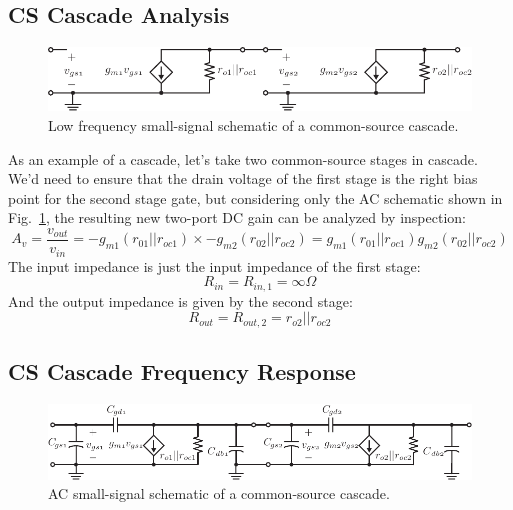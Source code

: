 \subsection{CS Cascade Analysis}
\begin{figure}[tb]
\begin{center}
\includegraphics[scale=1]{2cs_casc_ss}
\end{center}
\caption{Low frequency small-signal schematic of a common-source cascade.}
\label{fig:2cs_casc_ss}
\end{figure}

As an example of a cascade, let's take two common-source stages in cascade.  We'd need to ensure that the drain voltage of the first stage is the right bias point for the second stage gate, but considering only the AC schematic shown in Fig.~\ref{fig:2cs_casc_ss}, the resulting new two-port DC gain can be analyzed by inspection:
\begin{equation}
	A_v = \frac{v_{out}}{v_{in}} = -g_{m1} (r_{01}||r_{oc1}) \times  -g_{m2} (r_{02}||r_{oc2})
		= g_{m1} (r_{01}||r_{oc1}) g_{m2} (r_{02}||r_{oc2})
\end{equation}
The input impedance is just the input impedance of the first stage:
\begin{equation}
	R_{in} = R_{in,1} = \infty\Omega 
\end{equation} 
And the output impedance is given by the second stage:
\begin{equation}
	R_{out} = R_{out,2} = r_{o2} || r_{oc2} 
\end{equation}
\subsection{CS Cascade Frequency Response}
\begin{figure}[tb]
\begin{center}
\includegraphics[scale=1]{3cs_casc_ss_cap}
\end{center}
\caption{AC small-signal schematic of a common-source cascade.}
\label{fig:3cs_casc_ss_cap}
\end{figure}

